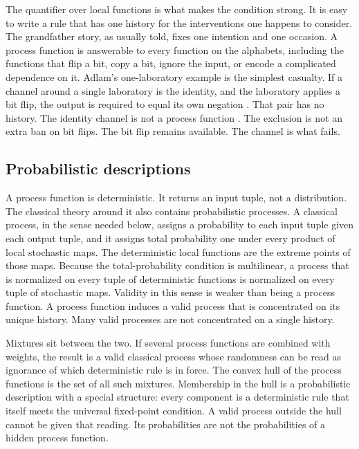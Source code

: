 \documentclass[11pt]{article}
\begin{document}
The quantifier over local functions is what makes the condition strong. It is easy to write a rule that has one history for the interventions one happens to consider. The grandfather story, as usually told, fixes one intention and one occasion. A process function is answerable to every function on the alphabets, including the functions that flip a bit, copy a bit, ignore the input, or encode a complicated dependence on it. Adlam's one-laboratory example is the simplest casualty. If a channel around a single laboratory is the identity, and the laboratory applies a bit flip, the output is required to equal its own negation \citep{adlam2023}. That pair has no history. The identity channel is not a process function \citep{adlam2023}. The exclusion is not an extra ban on bit flips. The bit flip remains available. The channel is what fails.

\subsection{Probabilistic descriptions}
\label{sec:prob}

A process function is deterministic. It returns an input tuple, not a distribution. The classical theory around it also contains probabilistic processes. A classical process, in the sense needed below, assigns a probability to each input tuple given each output tuple, and it assigns total probability one under every product of local stochastic maps. The deterministic local functions are the extreme points of those maps. Because the total-probability condition is multilinear, a process that is normalized on every tuple of deterministic functions is normalized on every tuple of stochastic maps. Validity in this sense is weaker than being a process function. A process function induces a valid process that is concentrated on its unique history. Many valid processes are not concentrated on a single history.

Mixtures sit between the two. If several process functions are combined with weights, the result is a valid classical process whose randomness can be read as ignorance of which deterministic rule is in force. The convex hull of the process functions is the set of all such mixtures. Membership in the hull is a probabilistic description with a special structure: every component is a deterministic rule that itself meets the universal fixed-point condition. A valid process outside the hull cannot be given that reading. Its probabilities are not the probabilities of a hidden process function.
\end{document}
